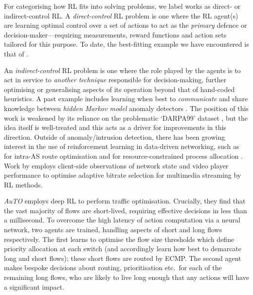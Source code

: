 \documentclass[10pt, times, comsoc]{IEEEtran}
\begin{document}
For categorising how RL fits into solving problems, we label works as direct- or indirect-control RL.
A \emph{direct-control} RL problem is one where the RL agent(s) are learning optimal control over a set of actions to act as the \emph{primary} defence or decision-maker---requiring measurements, reward functions and action sets tailored for this purpose.
To date, the best-fitting example we have encountered is that of \textcite{DBLP:journals/eaai/MalialisK15}.

An \emph{indirect-control} RL problem is one where the role played by the agents is to act in service to \emph{another technique} responsible for decision-making, further optimising or generalising aspects of its operation beyond that of hand-coded heuristics.
A past example includes learning when best to \emph{communicate} and share knowledge between \emph{hidden Markov model} anomaly detectors \cite{DBLP:conf/paisi/XuSH07}.
The position of this work is weakened by its reliance on the problematic `DARPA99' dataset \cite{DBLP:conf/sp/SommerP10}, but the idea itself is well-treated and this acts as a driver for improvements in this direction.
Outside of anomaly/intrusion detection, there has been growing interest in the use of reinforcement learning in data-driven networking, such as for intra-AS route optimisation \cite{DBLP:conf/hotnets/ValadarskySST17} and for resource-constrained process allocation \cite{DBLP:conf/hotnets/MaoAMK16}.
Work by \textcite{DBLP:conf/sigcomm/MaoNA17} employs client-side observations of network state and video player performance to optimise adaptive bitrate selection for multimedia streaming by RL methods.

\emph{AuTO} \cite{DBLP:conf/sigcomm/ChenL0L18} employs deep RL to perform traffic optimisation.
Crucially, they find that the vast majority of flows are short-lived, requiring effective decisions in less than a millisecond.
To overcome the high latency of action computation via a neural network, two agents are trained, handling aspects of short and long flows respectively.
The first learns to optimise the flow size thresholds which define priority allocation at each switch (and accordingly learn how best to demarcate long and short flows); these short flows are routed by ECMP.
The second agent makes bespoke decisions about routing, prioritisation etc.\ for each of the remaining long flows, who are likely to live long enough that any actions will have a significant impact.
\end{document}
